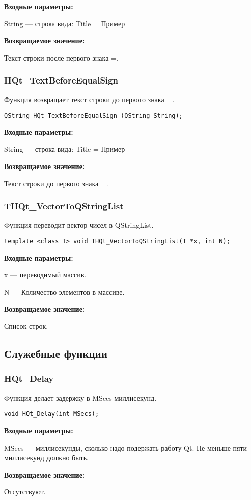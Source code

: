 \documentclass[a4paper,12pt]{article}
\begin{document}
\textbf{Входные параметры:}
 
String --- строка вида: Title = Пример

\textbf{Возвращаемое значение:}

Текст строки после первого знака =.


\subsubsection{HQt\_TextBeforeEqualSign}\label{HQt_TextBeforeEqualSign}

Функция возвращает текст строки до первого знака =.


\begin{lstlisting}[label=code_syntax_HQt_TextBeforeEqualSign,caption=Синтаксис]
QString HQt_TextBeforeEqualSign (QString String);
\end{lstlisting}

\textbf{Входные параметры:}
 
String --- строка вида: Title = Пример

\textbf{Возвращаемое значение:}

Текст строки до первого знака =.


\subsubsection{THQt\_VectorToQStringList}\label{THQt_VectorToQStringList}

Функция переводит вектор чисел в QStringList.


\begin{lstlisting}[label=code_syntax_THQt_VectorToQStringList,caption=Синтаксис]
template <class T> void THQt_VectorToQStringList(T *x, int N);
\end{lstlisting}

\textbf{Входные параметры:}

x --- переводимый массив.

     N --- Количество элементов в массиве.

\textbf{Возвращаемое значение:}
 
Список строк.


\subsection{Служебные функции}

\subsubsection{HQt\_Delay}\label{HQt_Delay}

Функция делает задержку в MSecs миллисекунд.


\begin{lstlisting}[label=code_syntax_HQt_Delay,caption=Синтаксис]
void HQt_Delay(int MSecs);
\end{lstlisting}

\textbf{Входные параметры:}

MSecs --- миллисекунды, сколько надо подержать работу Qt. Не меньше пяти миллисекунд должно быть.

\textbf{Возвращаемое значение:}

Отсутствуют.
\end{document}

